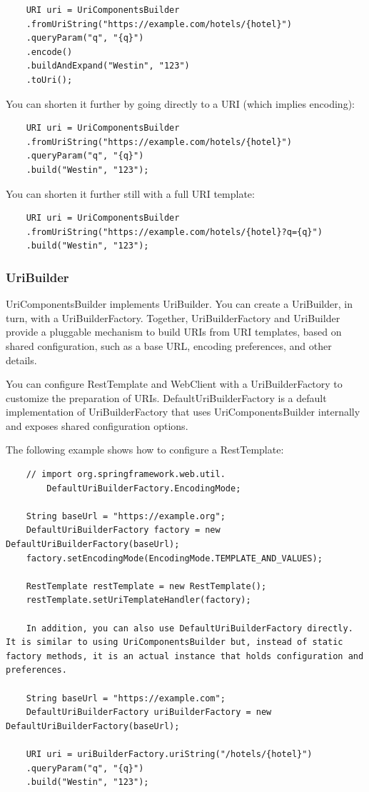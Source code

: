 \documentclass{scrartcl}
\begin{document}
\begin{lstlisting}
    URI uri = UriComponentsBuilder
    .fromUriString("https://example.com/hotels/{hotel}")
    .queryParam("q", "{q}")
    .encode()
    .buildAndExpand("Westin", "123")
    .toUri();

\end{lstlisting}

You can shorten it further by going directly to a URI (which implies encoding):

\begin{lstlisting}
    URI uri = UriComponentsBuilder
    .fromUriString("https://example.com/hotels/{hotel}")
    .queryParam("q", "{q}")
    .build("Westin", "123");

\end{lstlisting}

You can shorten it further still with a full URI template:

\begin{lstlisting}
    URI uri = UriComponentsBuilder
    .fromUriString("https://example.com/hotels/{hotel}?q={q}")
    .build("Westin", "123");
\end{lstlisting}

\subsubsection{UriBuilder}

UriComponentsBuilder implements UriBuilder. You can create a UriBuilder, in turn, with a UriBuilderFactory. Together, UriBuilderFactory and UriBuilder provide a pluggable mechanism to build URIs from URI templates, based on shared configuration, such as a base URL, encoding preferences, and other details.

You can configure RestTemplate and WebClient with a UriBuilderFactory to customize the preparation of URIs. DefaultUriBuilderFactory is a default implementation of UriBuilderFactory that uses UriComponentsBuilder internally and exposes shared configuration options.

The following example shows how to configure a RestTemplate:
\begin{lstlisting}
    // import org.springframework.web.util.
        DefaultUriBuilderFactory.EncodingMode;

    String baseUrl = "https://example.org";
    DefaultUriBuilderFactory factory = new DefaultUriBuilderFactory(baseUrl);
    factory.setEncodingMode(EncodingMode.TEMPLATE_AND_VALUES);

    RestTemplate restTemplate = new RestTemplate();
    restTemplate.setUriTemplateHandler(factory);

    In addition, you can also use DefaultUriBuilderFactory directly. It is similar to using UriComponentsBuilder but, instead of static factory methods, it is an actual instance that holds configuration and preferences.

    String baseUrl = "https://example.com";
    DefaultUriBuilderFactory uriBuilderFactory = new DefaultUriBuilderFactory(baseUrl);

    URI uri = uriBuilderFactory.uriString("/hotels/{hotel}")
    .queryParam("q", "{q}")
    .build("Westin", "123");
\end{lstlisting}
\end{document}
